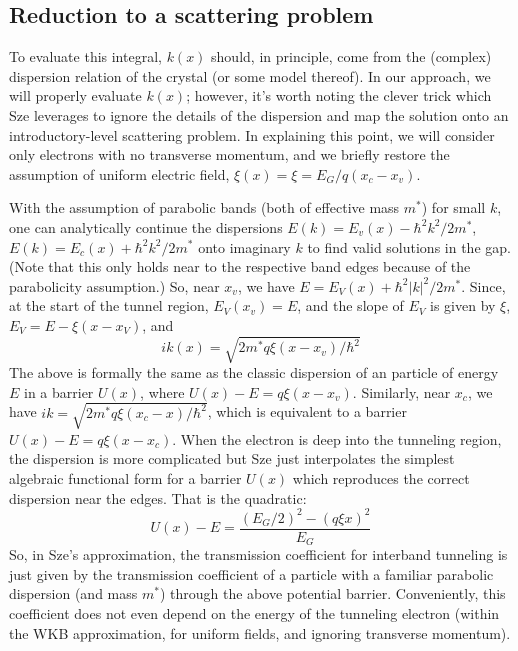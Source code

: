 \subsection{Reduction to a scattering problem}
To evaluate this integral, $k(x)$ should, in principle, come from the (complex) dispersion relation of the crystal (or some model thereof).  In our approach, we will properly evaluate $k(x)$; however, it's worth noting the clever trick which Sze leverages to ignore the details of the dispersion and map the solution onto an introductory-level scattering problem.  In explaining this point, we will consider only electrons with no transverse momentum, and we briefly restore the assumption of uniform electric field, $\xi(x)=\xi=E_G/q(x_c-x_v)$.

With the assumption of parabolic bands (both of effective mass $m^*$) for small $k$, one can  analytically continue the dispersions $E(k)=E_v(x)-\hbar^2k^2/2m^*$, $E(k)=E_c(x)+\hbar^2k^2/2m^*$ onto imaginary $k$ to find valid solutions in the gap.  (Note that this only holds near to the respective band edges because of the parabolicity assumption.)  So, near $x_v$, we have $E=E_V(x)+\hbar^2|k|^2/2m^*$.  Since, at the start of the tunnel region, $E_V(x_v)=E$, and the slope of $E_V$ is given by $\xi$, $E_V=E-\xi(x-x_V)$, and
$$ik(x)=\sqrt{2m^*q\xi(x-x_v)/\hbar^2}$$
The above is formally the same as the classic dispersion of an particle of energy $E$ in a barrier $U(x)$, where $U(x)-E=q\xi(x-x_v)$.  Similarly, near $x_c$, we have $ik=\sqrt{2m^*q\xi(x_c-x)/\hbar^2}$, which is equivalent to a barrier $U(x)-E=q\xi(x-x_c)$.  When the electron is deep into the tunneling region, the dispersion is more complicated but Sze just interpolates the simplest algebraic functional form for a barrier $U(x)$ which reproduces the correct dispersion near the edges.  That is the quadratic:
$$U(x)-E=\frac{(E_G/2)^2-(q\xi x)^2}{E_G}$$
So, in Sze's approximation, the transmission coefficient for interband tunneling is just given by the transmission coefficient of a particle with a familiar parabolic dispersion (and mass $m^*$) through the above potential barrier.  Conveniently, this coefficient does not even depend on the energy of the tunneling electron (within the WKB approximation, for uniform fields, and ignoring transverse momentum).